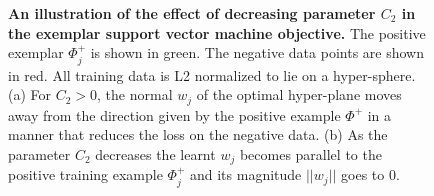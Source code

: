 \documentclass[table]{article} %
\begin{document}
	
\begin{figure}[t]
    \begin{center}
    \caption{{\bf An illustration of the effect of decreasing parameter $C_2$ in the exemplar support vector machine objective.} The positive exemplar $\Phi_j^+$ is shown in green. The negative data points are shown in red. All training data is L2 normalized to lie on a hyper-sphere. (a) For $C_2>0$, the normal $w_j$ of the optimal hyper-plane moves away from the direction given by the positive example $\Phi^+$ in a manner that reduces the loss on the negative data.  (b) As the parameter $C_2$ decreases the learnt $w_j$ becomes parallel to the positive training example $\Phi_j^+$ and its magnitude $||w_j||$ goes to 0.}
    \label{fig:C2effect}
    \end{center}
\end{figure}
\end{document}
